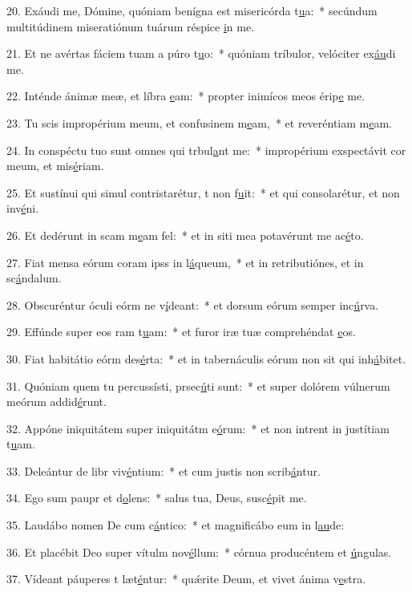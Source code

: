 20. Exáudi me, Dómine, quóniam benígna est misericórda t\uline{u}a:~* secúndum multitúdinem miseratiónum tuárum réspice \uline{i}n me.\par 
21. Et ne avértas fáciem tuam a púro t\uline{u}o:~* quóniam tríbulor, velóciter ex\uline{áu}di me.\par 
22. Inténde ánimæ meæ, et líbra \uline{e}am:~* propter inimícos meos érip\uline{e} me.\par 
23. Tu scis impropérium meum, et confusinem m\uline{e}am,~* et reveréntiam m\uline{e}am.\par 
24. In conspéctu tuo sunt omnes qui trbul\uline{a}nt me:~* impropérium exspectávit cor meum, et mis\uline{é}riam.\par 
25. Et sustínui qui simul contristarétur, t non f\uline{u}it:~* et qui consolarétur, et non inv\uline{é}ni.\par 
26. Et dedérunt in scam m\uline{e}am fel:~* et in siti mea potavérunt me ac\uline{é}to.\par 
27. Fiat mensa eórum coram ipss in l\uline{á}queum,~* et in retributiónes, et in sc\uline{á}ndalum.\par 
28. Obscuréntur óculi eórm ne v\uline{í}deant:~* et dorsum eórum semper inc\uline{ú}rva.\par 
29. Effúnde super eos ram t\uline{u}am:~* et furor iræ tuæ comprehéndat \uline{e}os.\par 
30. Fiat habitátio eórm des\uline{é}rta:~* et in tabernáculis eórum non sit qui inh\uline{á}bitet.\par 
31. Quóniam quem tu percussísti, prsec\uline{ú}ti sunt:~* et super dolórem vúlnerum meórum addid\uline{é}runt.\par 
32. Appóne iniquitátem super iniquitátm e\uline{ó}rum:~* et non intrent in justítiam t\uline{u}am.\par 
33. Deleántur de libr viv\uline{é}ntium:~* et cum justis non scrib\uline{á}ntur.\par 
34. Ego sum paupr et d\uline{o}lens:~* salus tua, Deus, susc\uline{é}pit me.\par 
35. Laudábo nomen De cum c\uline{á}ntico:~* et magnificábo eum in l\uline{au}de:\par 
36. Et placébit Deo super vítulm nov\uline{é}llum:~* córnua producéntem et \uline{ú}ngulas.\par 
37. Vídeant páuperes t læt\uline{é}ntur:~* quǽrite Deum, et vivet ánima v\uline{e}stra.\par 
